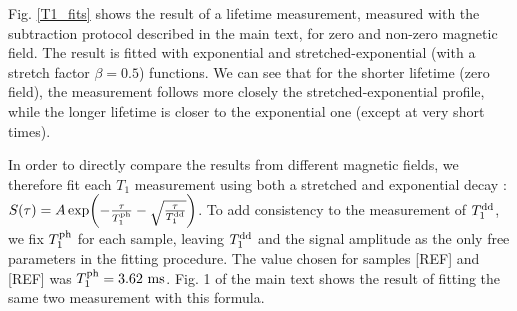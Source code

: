 \documentclass[preprintnumbers,amsmath,amssymb,onecolumn,12pt]{revtex4-2}\usepackage{graphicx}%
\begin{document}
Fig. \ref{T1_fits} shows the result of a lifetime measurement, measured with the subtraction protocol described in the main text, for zero and non-zero magnetic field. The result is fitted with exponential and stretched-exponential (with a stretch factor $\beta=0.5$) functions. We can see that for the shorter lifetime (zero field), the measurement follows more closely the stretched-exponential profile, while the longer lifetime is closer to the exponential one (except at very short times).

In order to directly compare the results from different magnetic fields, we therefore fit each $T_1$ measurement using both a stretched and exponential decay : $S(\tau)=A \exp (-\frac{\tau}{T_1^{\rm ph}} -\sqrt{\frac{\tau}{T_1^{\rm dd}}})$.
To add consistency to the measurement of $T_1^{\rm dd}$, we fix $T_1^{\rm ph}$ for each sample, leaving $T_1^{\rm dd}$ and the signal amplitude as the only free parameters in the fitting procedure. The value chosen for samples [REF] and [REF] was $T_1^{\rm ph}=3.62\ \rm ms$. Fig. 1 of the main text shows the result of fitting the same two measurement with this formula.
\end{document}
